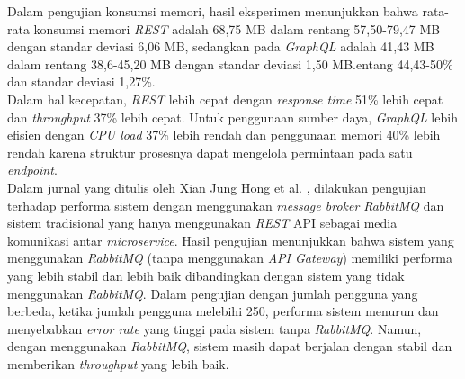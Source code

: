 Dalam pengujian konsumsi memori, hasil eksperimen menunjukkan bahwa rata-rata konsumsi memori \textit{REST} adalah 68,75 MB dalam rentang 57,50-79,47 MB dengan standar deviasi 6,06 MB, sedangkan pada \textit{GraphQL} adalah 41,43 MB dalam rentang 38,6-45,20 MB dengan standar deviasi 1,50 MB.entang 44,43-50\% dan standar deviasi 1,27\%.\\

Dalam hal kecepatan, \textit{REST} lebih cepat dengan \textit{response time} 51\% lebih cepat dan \textit{\textit{throughput}} 37\% lebih cepat. Untuk penggunaan sumber daya, \textit{GraphQL} lebih efisien dengan \textit{CPU load} 37\% lebih rendah dan penggunaan memori 40\% lebih rendah karena struktur prosesnya dapat mengelola permintaan pada satu \textit{endpoint}.\\

Dalam jurnal yang ditulis oleh Xian Jung Hong et al. \cite{9}, dilakukan pengujian terhadap performa sistem dengan menggunakan \textit{message broker RabbitMQ} dan sistem tradisional yang hanya menggunakan \textit{REST} API sebagai media komunikasi antar \textit{microservice}. Hasil pengujian menunjukkan bahwa sistem yang menggunakan \textit{RabbitMQ} (tanpa menggunakan \textit{API Gateway}) memiliki performa yang lebih stabil dan lebih baik dibandingkan dengan sistem yang tidak menggunakan \textit{RabbitMQ}. Dalam pengujian dengan jumlah pengguna yang berbeda, ketika jumlah pengguna melebihi 250, performa sistem menurun dan menyebabkan \textit{error rate} yang tinggi pada sistem tanpa \textit{RabbitMQ}. Namun, dengan menggunakan \textit{RabbitMQ}, sistem masih dapat berjalan dengan stabil dan memberikan \textit{throughput} yang lebih baik.\\

